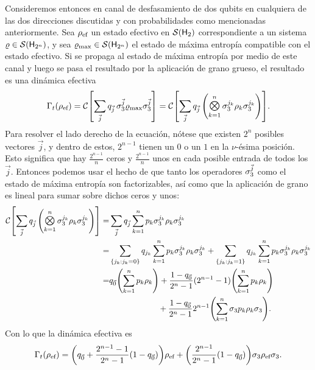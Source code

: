 Consideremos entonces en canal de desfasamiento de dos qubits en cualquiera de las dos direcciones discutidas y con probabilidades como mencionadas anteriormente. Sea $\rho_{\text{ef}}$ un estado efectivo en $\mathcal{S}({\sf H}_{2})$ correspondiente a un sistema $\varrho \in \mathcal{S}({\sf H}_{2^{n}})$, y sea $\varrho_{\max}\in\mathcal{S}({\sf H}_{2^{n}})$ el estado de máxima entropía compatible con el estado efectivo. Si se propaga al estado de máxima entropía por medio de este canal y luego se pasa el resultado por la aplicación de grano grueso, el resultado es una dinámica efectiva
\begin{equation}
  \Gamma_{t}(\rho_{\ef})=\mcC\qty[\sum_{\vec{j}}q_{\vec{j}}\,\pauli{3}^{\vec{j}}\varrho_{\max}\pauli{3}^{\vec{j}}]=\mcC\qty[\sum_{\vec{j}}q_{\vec{j}}\,\qty(\Motimes_{k=1}^{n} \pauli{3}^{j_{k}}\rho_{k}\pauli{3}^{j_{k}})]\nonumber.\nonumber
\end{equation}
Para resolver el lado derecho de la ecuación, nótese que existen $2^{n}$ posibles vectores $\vec{j}$, y dentro de estos, $2^{n-1}$ tienen un $0$ o un $1$ en la $\nu$-ésima posición. Esto significa que hay $\frac{2^{n-1}}{n}$ ceros y $\frac{2^{n-1}}{n}$ unos en cada posible entrada de todos los $\vec{j}$. Entonces podemos usar el hecho de que tanto los operadores $\sigma_{3}^{\vec{j}}$ como el estado de máxima entropía son factorizables, así como que la aplicación de grano es lineal para sumar sobre dichos ceros y unos:
\begin{align}
    \mcC\qty[\sum_{\vec{j}}q_{\vec{j}}\,\qty(\Motimes_{k=1}^{n} \pauli{3}^{j_{k}}\rho_{k}\pauli{3}^{j_{k}})]=&\sum_{\vec{j}}q_{\vec{j}}\sum_{k=1}^{n}p_{k}\pauli{3}^{j_{k}}\rho_{k}\pauli{3}^{j_{k}}\nonumber\\
    =&\sum_{\{j_{k}:j_{k}=0\}}q_{j_{k}}\sum_{k=1}^{n}p_{k}\pauli{3}^{j_{k}}\rho_{k}\pauli{3}^{j_{k}}+\sum_{\{j_{k}:j_{k}=1\}}q_{j_{k}}\sum_{k=1}^{n}p_{k}\pauli{3}^{j_{k}}\rho_{k}\pauli{3}^{j_{k}}\nonumber\\
    =&q_{\vec{0}}\qty(\sum_{k=1}^{n}p_{k}\rho_{k})+\frac{1-q_{\vec{0}}}{2^{n}-1}(2^{n-1}-1)\qty(\sum_{k=1}^{n}p_{k}\rho_{k})\nonumber\\
    & \ \ \ \ \ \ \ \ \ \ \ \ \ \ \ \ \ \ +\frac{1-q_{\vec{0}}}{2^{n}-1}2^{n-1}\qty(\sum_{k=1}^{n}\pauli{3}p_{k}\rho_{k}\pauli{3}).\nonumber
\end{align}
Con lo que la dinámica efectiva es
\begin{equation}
    \Gamma_{t}(\rho_{\text{ef}})=\qty(q_{\vec{0}}+\frac{2^{n-1}-1}{2^{n}-1}(1-q_{\vec{0}}))\rho_{\text{ef}}+\qty(\frac{2^{n-1}}{2^{n}-1}(1-q_{\vec{0}}))\sigma_{3}\rho_{\text{ef}}\sigma_{3}.\nonumber
\end{equation}
